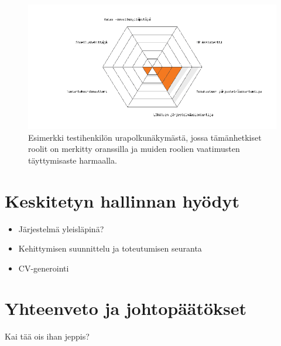 \documentclass[a4paper,finnish,12pt]{article}
\begin{document}
\begin{figure}[ht]
\centering
\includegraphics[width=1\textwidth]{urapolkuPlot_tst_usr.png}
\caption{Esimerkki testihenkilön urapolkunäkymästä, jossa tämänhetkiset roolit on merkitty oranssilla ja muiden roolien vaatimusten täyttymisaste harmaalla.}
\label{fig:urapolkuspiderweb}
\end{figure}

\clearpage

\section{Keskitetyn hallinnan hyödyt}

\begin{itemize}
\item Järjestelmä yleisläpinä?
\item Kehittymisen suunnittelu ja toteutumisen seuranta
\item CV-generointi
\end{itemize}

\clearpage

\section{Yhteenveto ja johtopäätökset}

Kai tää ois ihan jeppis?

\clearpage

\clearpage



\appendix
\end{document}
